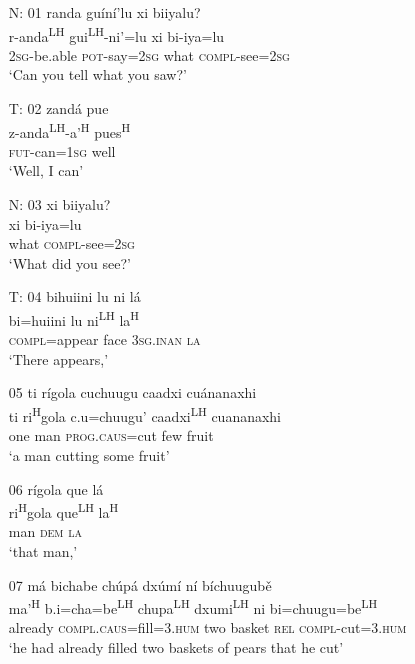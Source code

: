 

\begin{itemize}

\item[N: 01]
randa gu\'{i}n\'{i}'lu xi biiyalu?\\
r-anda\textsuperscript{LH} gui\textsuperscript{LH}-ni'=lu xi bi-iya=lu\\
\textsc{2sg}-be.able \textsc{pot}-say=\textsc{2sg} what \textsc{compl}-see=\textsc{2sg}\\
\glt `Can you tell what you saw?' 
 

\item[T: 02]
\glll zand\'{a} pue\\
z-anda\textsuperscript{LH}-a'\textsuperscript{H} pues\textsuperscript{H}\\
\textsc{fut}-can=\textsc{1sg} well\\
\glt `Well, I can'
 

\item[N: 03]
xi biiyalu?\\
xi bi-iya=lu\\
what \textsc{compl}-see=\textsc{2sg}\\
\glt `What did you see?'


\item[T: 04]
\glll bihuiini lu ni l\'{a}\\
bi=huiini lu ni\textsuperscript{LH} la\textsuperscript{H}\\
\textsc{compl}=appear face \textsc{3sg.inan} \textsc{la}\\
\glt `There appears,'


\item[05]
\glll ti r\'{i}gola cuchuugu caadxi cu\'{a}nanaxhi\\
ti ri\textsuperscript{H}gola c.u=chuugu' caadxi\textsuperscript{LH} cuananaxhi\\
one man \textsc{prog}.\textsc{caus}=cut few fruit\\
\glt `a man cutting some fruit'


\item[06]
\glll r\'{i}gola que l\'{a}\\
ri\textsuperscript{H}gola que\textsuperscript{LH} la\textsuperscript{H}\\
man \textsc{dem} \textsc{la}\\
\glt `that man,'


\item[07]
\glll m\'{a} bichabe ch\'{u}p\'{a} dx\'{u}m\'{i} n\'{i} b\'{i}chuugub\v{e}\\
ma'\textsuperscript{H} b.i=cha=be\textsuperscript{LH}  chupa\textsuperscript{LH} dxumi\textsuperscript{LH} ni bi=chuugu=be\textsuperscript{LH}\\
already \textsc{compl}.\textsc{caus}=fill=\textsc{3.hum} two basket \textsc{rel} \textsc{compl}-cut=\textsc{3.hum}\\
\glt `he had already filled two baskets of pears that he cut'



\end{itemize}
